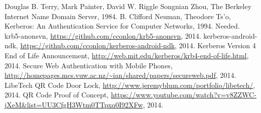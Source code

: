 \documentclass[]{report}   %
\begin{document}
\begin{thebibliography}{9}
 Douglas B. Terry, Mark Painter, David W. Riggle Songnian Zhou, The Berkeley Internet Name Domain Server, 1984.   
 B. Clifford Neuman, Theodore Ts'o, Kerberos: An Authentication Service for Computer Networks, 1994. 
 Needed.
 krb5-anonsvn, \url{https://github.com/cconlon/krb5-anonsvn}, 2014.
 kerberos-android-ndk, \url{https://github.com/cconlon/kerberos-android-ndk}, 2014.
 Kerberos Version 4 End of Life Announcement, \url{http://web.mit.edu/kerberos/krb4-end-of-life.html}, 2014.
 Secure Web Authentication with Mobile Phones, \url{http://homepages.mcs.vuw.ac.nz/~ian/shared/papers/secureweb.pdf}, 2014.
 LibeTech QR Code Door Lock, \url{http://www.jeremyblum.com/portfolio/libetech/}, 2014.
 QR Code Proof of Concept, \url{https://www.youtube.com/watch?v=v8ZZWC-jXeM\&list=UU3CfgH3Wtm0TTpxq0I92XFw}, 2014.
\end{thebibliography}
\end{document}
